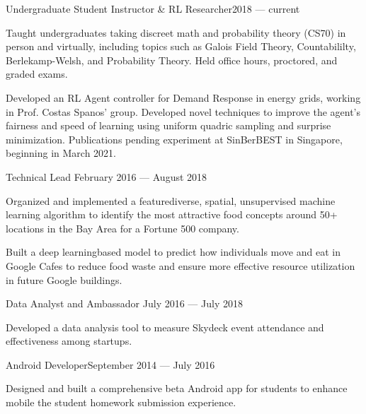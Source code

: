 \documentclass[10pt]{article}
\begin{document}
            {Undergraduate Student Instructor \& RL Researcher}{2018 --- current}
                  \begin{accomplishments}
                \item Taught undergraduates taking discreet math and probability theory (CS70) in person and virtually, including topics such as Galois Field Theory, Countabililty, Berlekamp-Welsh, and Probability Theory. Held office hours, proctored, and graded exams.
                \item Developed an RL Agent controller for Demand Response in energy grids, working in Prof. Costas Spanos' group. Developed novel techniques to improve the agent's fairness and speed of learning using uniform quadric sampling and surprise minimization.
                  Publications pending experiment at SinBerBEST in Singapore, beginning in March 2021.
                \end{accomplishments}


								{Technical Lead}
								{February 2016 --- August 2018}                  		
	                   \begin{accomplishments} 
	                    		\item Organized and implemented a feature{\textendash}diverse, spatial, unsupervised machine learning algorithm to identify the most attractive food concepts around 50+ locations in the Bay Area for a Fortune 500 company.
                          \item Built a deep learning{\textendash}based model to predict how individuals move and eat in Google Cafes to reduce food waste and ensure more effective resource utilization in future Google buildings.
	                    \end{accomplishments}
	                    		
	   		
	   		\employer{Skydeck Berkeley}{Berkeley, CA}
	   			{Data Analyst and Ambassador}
	   			{July 2016 --- July 2018}
			  		\begin{accomplishments}
	                   		\item Developed a data analysis tool to measure Skydeck event attendance and effectiveness among startups.
	                  \end{accomplishments}
                  	 
                  	 
                {Android Developer}{September 2014 --- July 2016}
                 			\begin{accomplishments}					        
                   			\item Designed and built a comprehensive beta Android app for students to enhance mobile the student homework submission experience.
                  		 \end{accomplishments}
                  		 
\end{document}
